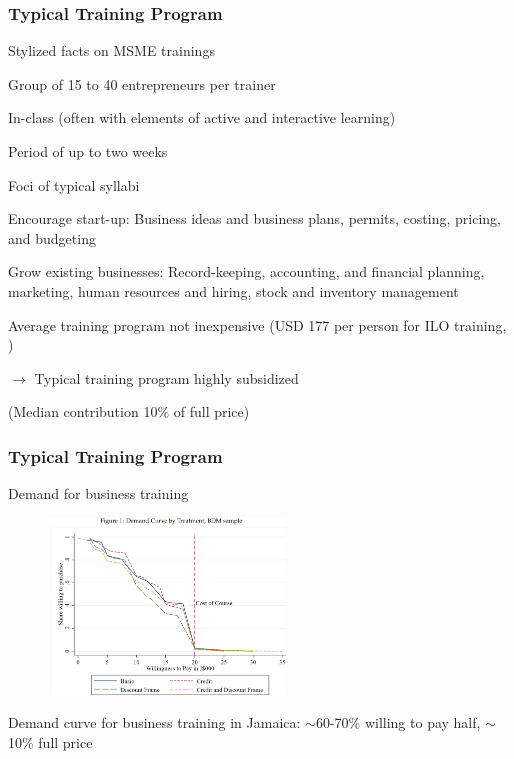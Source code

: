 \documentclass[hideothersubsections, usenames,dvipsnames,11pt]{beamer}
\newenvironment{itemize_2pt}{\itemize\addtolength{\itemsep}{2pt}}{\enditemize}
\begin{document}

\begin{frame}
\frametitle{Typical Training Program}
Stylized facts on MSME trainings
\begin{itemize_2pt}
	\item Group of 15 to 40 entrepreneurs per trainer
	\item In-class (often with elements of active and interactive learning)
	\item Period of up to two weeks	
	\item Foci of typical syllabi
	\begin{itemize_2pt}
		\item \textcolor{bdf}{Encourage start-up}: Business ideas and business plans, permits, costing, pricing, and budgeting
		\item \textcolor{bdf}{Grow existing businesses}: Record-keeping, accounting, and financial planning, marketing, human resources and hiring, stock and inventory management
	\end{itemize_2pt}
	
	\item Average training program not inexpensive (USD 177 per person for ILO training, \citet{Lieshout2017})
	\item[] $\rightarrow$ Typical training program \textcolor{bdf}{highly subsidized}
	\item[] \quad (Median contribution 10\% of full price)
	
\end{itemize_2pt}

\end{frame}


\begin{frame}
\frametitle{Typical Training Program}
	
Demand for business training
	
\begin{figure}[htbp]
	\centering
	\includegraphics[width=17em]{pics/Maffioli2020_demand.png}
	\label{Maffioli(2020): Demand}
\end{figure}

\begin{itemize_2pt}
	\item Demand curve for business training in Jamaica: $\sim$60-70\% willing to pay half, $\sim$10\% full price \citep{Maffioli2020}
\end{itemize_2pt}

\end{frame}
\end{document}
